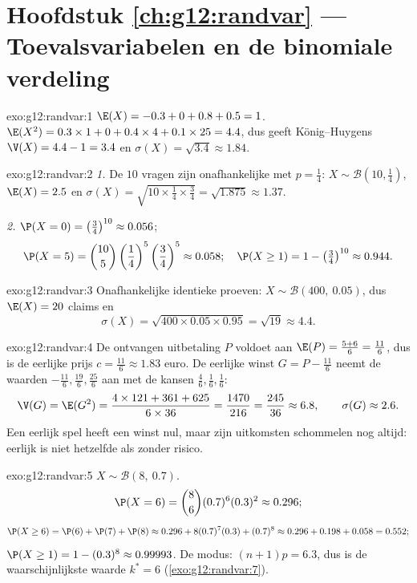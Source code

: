 \section*{Hoofdstuk \ref{ch:g12:randvar} --- Toevalsvariabelen en de binomiale verdeling}

\begin{solution}{exo:g12:randvar:1}
$\E(X) = -0.3 + 0 + 0.8 + 0.5 = 1$.
$\E(X^2) = 0.3 \times 1 + 0 + 0.4\times4 + 0.1\times25 = 4.4$, dus geeft
König--Huygens $\V(X) = 4.4 - 1 = 3.4$ en
$\sigma(X) = \sqrt{3.4} \approx 1.84$.
\end{solution}

\begin{solution}{exo:g12:randvar:2}
\emph{1.} De $10$ vragen zijn onafhankelijke  met
$p = \frac14$: $X \sim \mathcal B\left(10, \frac14\right)$,
$\E(X) = 2.5$ en
$\sigma(X) = \sqrt{10 \times \frac14 \times \frac34} = \sqrt{1.875}
\approx 1.37$.

\emph{2.} $\P(X = 0) = \left(\frac34\right)^{10} \approx 0.056$;
\[
\P(X = 5) = \binom{10}{5}\left(\frac14\right)^5\left(\frac34\right)^5
\approx 0.058;
\quad
\P(X \geq 1) = 1 - \left(\tfrac34\right)^{10} \approx 0.944 .
\]
\end{solution}

\begin{solution}{exo:g12:randvar:3}
Onafhankelijke identieke proeven: $X \sim \mathcal B(400,\ 0.05)$, dus
$\E(X) = 20$ claims en
\[
\sigma(X) = \sqrt{400 \times 0.05 \times 0.95} = \sqrt{19} \approx 4.4 .
\]
\end{solution}

\begin{solution}{exo:g12:randvar:4}
De ontvangen uitbetaling $P$ voldoet aan $\E(P) = \frac{5 + 6}{6} =
\frac{11}{6}$, dus is de eerlijke prijs $c = \frac{11}{6} \approx 1.83$ euro.
De eerlijke winst $G = P - \frac{11}6$ neemt de waarden
$-\frac{11}{6}, \frac{19}{6}, \frac{25}{6}$ aan met de kansen
$\frac46, \frac16, \frac16$:
\[
\V(G) = \E(G^2)
= \frac{4 \times 121 + 361 + 625}{6 \times 36} = \frac{1470}{216}
= \frac{245}{36} \approx 6.8,
\qquad \sigma(G) \approx 2.6 .
\]
Een eerlijk spel heeft een \emph{} winst nul, maar zijn uitkomsten
schommelen nog altijd: eerlijk is niet hetzelfde als zonder risico.
\end{solution}

\begin{solution}{exo:g12:randvar:5}
$X \sim \mathcal B(8,\ 0.7)$.
\[
\P(X = 6) = \binom86 (0.7)^6(0.3)^2 \approx 0.296 ;
\]
\[
\P(X \geq 6) = \P(6) + \P(7) + \P(8)
\approx 0.296 + 8(0.7)^7(0.3) + (0.7)^8
\approx 0.296 + 0.198 + 0.058 = 0.552 ;
\]
$\P(X \geq 1) = 1 - (0.3)^8 \approx 0.99993$. De modus:
$(n+1)p = 6.3$, dus is de waarschijnlijkste waarde $k^* = 6$
(\cref{exo:g12:randvar:7}).
\end{solution}

